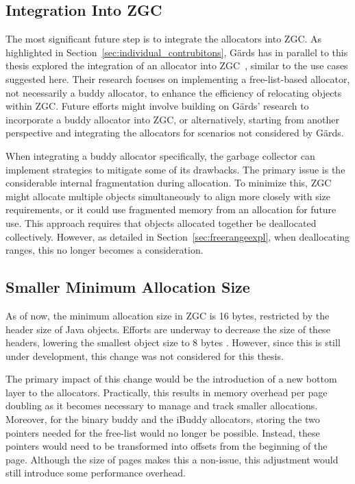 \subsection{Integration Into ZGC} \label{sec:futureworkZ}
The most significant future step is to integrate the allocators into ZGC. As highlighted in Section~\ref{sec:individual_contrubitons}, Gärds has in parallel to this thesis explored the integration of an allocator into ZGC~\cite{niclas}, similar to the use cases suggested here. Their research focuses on implementing a free-list-based allocator, not necessarily a buddy allocator, to enhance the efficiency of relocating objects within ZGC. Future efforts might involve building on Gärds' research to incorporate a buddy allocator into ZGC, or alternatively, starting from another perspective and integrating the allocators for scenarios not considered by Gärds.

When integrating a buddy allocator specifically, the garbage collector can implement strategies to mitigate some of its drawbacks. The primary issue is the considerable internal fragmentation during allocation. To minimize this, ZGC might allocate multiple objects simultaneously to align more closely with size requirements, or it could use fragmented memory from an allocation for future use. This approach requires that objects allocated together be deallocated collectively. However, as detailed in Section~\ref{sec:freerangeexpl}, when deallocating ranges, this no longer becomes a consideration.

\subsection{Smaller Minimum Allocation Size}
As of now, the minimum allocation size in ZGC is 16 bytes, restricted by the header size of Java objects. Efforts are underway to decrease the size of these headers, lowering the smallest object size to 8 bytes \cite{liliput}. However, since this is still under development, this change was not considered for this thesis.

The primary impact of this change would be the introduction of a new bottom layer to the allocators. Practically, this results in memory overhead per page doubling as it becomes necessary to manage and track smaller allocations. Moreover, for the binary buddy and the iBuddy allocators, storing the two pointers needed for the free-list would no longer be possible. Instead, these pointers would need to be transformed into offsets from the beginning of the page. Although the size of pages makes this a non-issue, this adjustment would still introduce some performance overhead.

